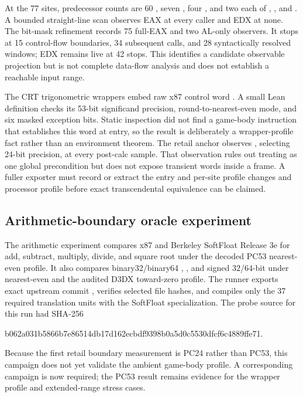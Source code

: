 At the 77  sites, predecessor counts are 60 , seven
, four , and two each of , , and
.  A bounded straight-line scan observes EAX at every caller and
EDX at none.  The bit-mask refinement records 75 full-EAX and two AL-only
observers.  It stops at 15 control-flow boundaries, 34 subsequent calls, and
28 syntactically resolved windows; EDX remains live at 42 stops.  This
identifies a candidate observable projection but is not complete data-flow
analysis and does not establish a reachable input range.

The CRT trigonometric wrappers embed raw x87 control word .  A
small Lean definition checks its 53-bit significand precision,
round-to-nearest-even mode, and six masked exception bits.  Static inspection
did not find a game-body instruction that establishes this word at entry, so
the result is deliberately a wrapper-profile fact rather than an environment
theorem.  The retail anchor observes , selecting 24-bit precision,
at every post-calc sample.  That observation rules out treating 
as one global precondition but does not expose transient words inside a frame.
A fuller exporter must record or extract the entry and per-site profile changes
and processor profile before exact transcendental equivalence can be claimed.

\subsection{Arithmetic-boundary oracle experiment}

The arithmetic experiment compares x87 and Berkeley SoftFloat Release 3e for
add, subtract, multiply, divide, and square root under the decoded PC53
nearest-even profile.  It also compares binary32/binary64 ,
, and signed 32/64-bit  under nearest-even and the
audited D3DX toward-zero profile.  The runner exports exact upstream commit
, verifies selected file hashes,
and compiles only the 37 required translation units with the SoftFloat
 specialization.  The probe source for this run had SHA-256
\begin{center}
\small\ttfamily
b062a031b5866b7e86514db17d162ecbdf9398b0a5d0c5530dfcf6c4889ffe71.
\end{center}

Because the first retail boundary measurement is PC24 rather than PC53, this
campaign does not yet validate the ambient game-body profile.  A corresponding
 campaign is now required; the PC53 result remains evidence for
the wrapper profile and extended-range stress cases.

